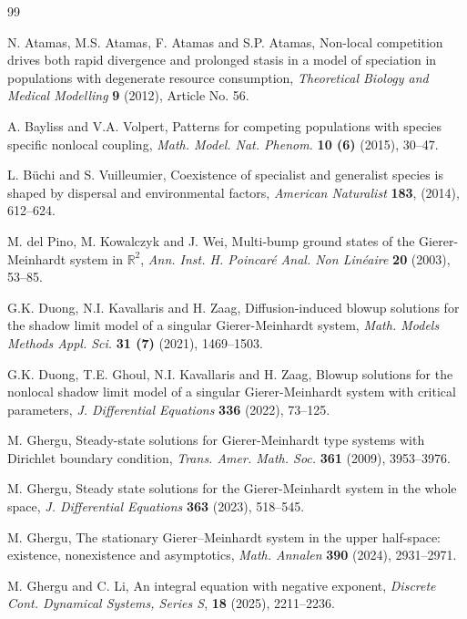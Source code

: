 \documentclass[leqno,12pt]{article}
\newcommand{\R}{\mathbb R}
\numberwithin{equation}{section}
\begin{document}
\begin{thebibliography}{99}


N. Atamas, M.S. Atamas, F. Atamas and S.P. Atamas,
Non-local competition drives both rapid divergence and prolonged stasis in a model of speciation in populations with degenerate resource consumption,
{\it Theoretical Biology and Medical Modelling} {\bf 9} (2012), Article No. 56.

 A. Bayliss and V.A. Volpert, Patterns for competing populations with species specific nonlocal coupling,
{\it Math. Model. Nat. Phenom.} {\bf 10 (6)} (2015), 30--47.

 L. B\"{u}chi and S. Vuilleumier, Coexistence of specialist and generalist species is shaped by dispersal and environmental factors,
{\it American Naturalist} {\bf 183}, (2014), 612--624.

 M. del Pino, M. Kowalczyk and J. Wei, Multi-bump ground states of the Gierer-Meinhardt system in $\R^2$,
{\it  Ann. Inst. H. Poincar\'e  Anal. Non Lin\'eaire} {\bf 20} (2003), 53--85.

 G.K. Duong,  N.I. Kavallaris and H. Zaag,
Diffusion-induced blowup solutions for the shadow limit model of a singular Gierer-Meinhardt system,
{\it Math. Models Methods Appl. Sci.} {\bf 31 (7)} (2021), 1469--1503.

 G.K. Duong, T.E. Ghoul,  N.I. Kavallaris and H. Zaag, 
Blowup solutions for the nonlocal shadow limit model of a singular Gierer-Meinhardt system with critical parameters,
{\it J. Differential Equations} {\bf 336} (2022), 73--125. 

 M. Ghergu, Steady-state solutions for Gierer-Meinhardt type systems with Dirichlet boundary condition,
{\it Trans. Amer. Math. Soc.} {\bf 361} (2009), 3953--3976.

 M. Ghergu, Steady state solutions for the Gierer-Meinhardt system in the whole space,
{\it J.  Differential Equations} {\bf 363} (2023), 518--545.

 M. Ghergu, The stationary Gierer–Meinhardt system in the upper half-space: existence, nonexistence and asymptotics,
{\it Math. Annalen} {\bf 390} (2024), 2931--2971. 

 M. Ghergu and C. Li, An integral equation with negative exponent, {\it Discrete Cont. Dynamical Systems, Series S},  {\bf 18} (2025), 2211--2236.



\end{thebibliography}
\end{document}
